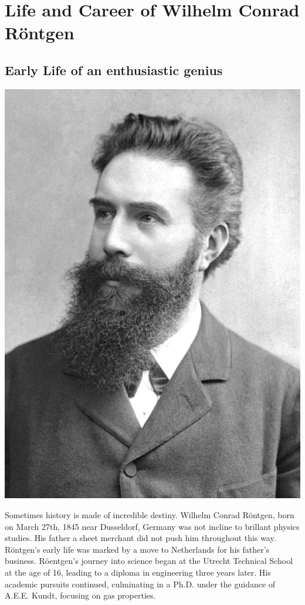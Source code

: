 \documentclass[a4paper,12pt]{report}
\begin{document}
\chapter{Life and Career of Wilhelm Conrad Röntgen}
\section{Early Life of an enthusiastic genius}

\begin{center}
  \includegraphics[scale=0.3]{roentgen.png}
  \label{fig=Röntgen}
\end{center}

Sometimes history is made of incredible destiny. Wilhelm Conrad Röntgen, born on March
27th, 1845 near Dusseldorf, Germany was not incline to brillant physics studies. His father a
sheet merchant did not push him throughout this way. Röntgen's early life was marked by a
move to Netherlands for his father's business. Röentgen's journey into science began at the
Utrecht Technical School at the age of 16, leading to a diploma in engineering three years later.
His academic pursuits continued, culminating in a Ph.D. under the guidance of A.E.E. Kundt,
focusing on gas properties.
\end{document}
